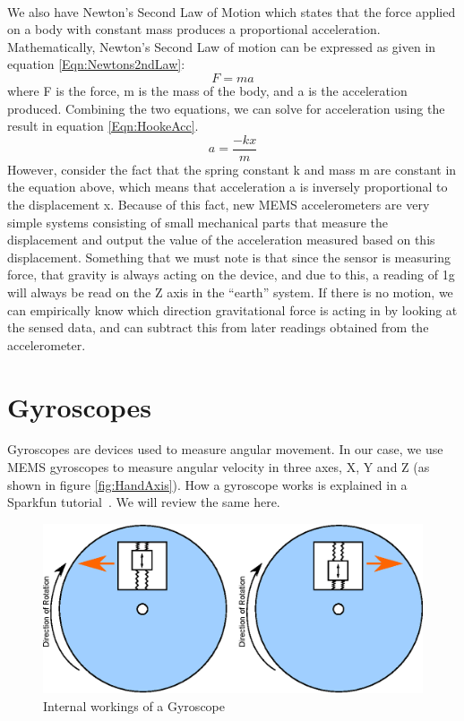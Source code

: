 \hfill \\
We also have Newton's Second Law of Motion
which states that the force applied on a body with constant mass produces a proportional acceleration.
Mathematically, Newton's Second Law of motion can be expressed as given in equation \ref{Eqn:Newtons2ndLaw}:
\begin{equation}
\label{Eqn:Newtons2ndLaw}
F = ma 
\end{equation}
where F is the force, m is the mass of the body, and a is the acceleration produced. Combining the two equations, we can solve for acceleration using the result in equation \ref{Eqn:HookeAcc}.
\begin{equation}
\label{Eqn:HookeAcc}
a = \frac{-kx}{m} 
\end{equation}
However, consider the fact that the spring constant k and mass m are constant in the equation above, which means that acceleration a is inversely proportional to the displacement x. Because of this fact, new MEMS accelerometers are very simple systems consisting of small mechanical parts that measure the displacement and output the value of the acceleration measured based on this displacement.
Something that we must note is that since the sensor is measuring force, that gravity is always acting on the device,
and due to this, a reading of 1g will always be read on the Z axis in the ``earth'' system.
If there is no motion, we can empirically know which direction gravitational force is acting in by looking at the sensed data,
and can subtract this from later readings obtained from the accelerometer.

\section{Gyroscopes}
\label{Sec:Gyroscope}

Gyroscopes are devices used to measure angular movement. In our case, we use MEMS gyroscopes to measure angular velocity in three axes, X, Y and Z (as shown in figure \ref{fig:HandAxis}). How a gyroscope works is explained in a Sparkfun tutorial~\cite{Web:SparkfunGyros}. We will review the same here.
\begin{figure}
\begin{center}
\includegraphics{images/GyroWork.eps}
\caption{Internal workings of a Gyroscope}
\label{fig:GyroDiag}
\end{center}
\end{figure}

